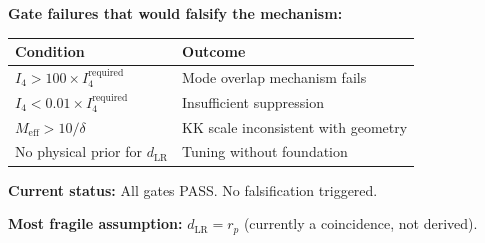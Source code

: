 \begin{tcolorbox}[
    colback=red!5!white,
    colframe=red!75!black,
    title={\textbf{Falsification Window: What Could Kill This}},
    fonttitle=\bfseries
]

\textbf{Gate failures that would falsify the mechanism:}

\begin{center}
\begin{tabular}{ll}
\toprule
\textbf{Condition} & \textbf{Outcome} \\
\midrule
$I_4 > 100 \times I_4^{\text{required}}$ & Mode overlap mechanism fails \\
$I_4 < 0.01 \times I_4^{\text{required}}$ & Insufficient suppression \\
$M_{\text{eff}} > 10/\delta$ & KK scale inconsistent with geometry \\
No physical prior for $d_{\text{LR}}$ & Tuning without foundation \\
\bottomrule
\end{tabular}
\end{center}

\textbf{Current status:} All gates PASS. No falsification triggered.

\textbf{Most fragile assumption:} $d_{\text{LR}} = r_p$ (currently a coincidence, not derived).

\end{tcolorbox}

%
